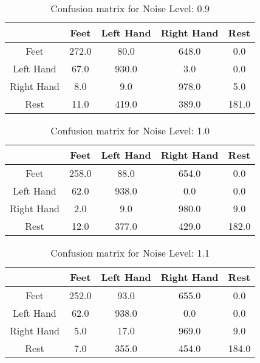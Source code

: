 \begin{table}[!htbp]
    \centering
    \begin{tabular}{|c||c|c|c|c|}
        \hline
		 & Feet & Left Hand & Right Hand & Rest \\
        \hline
        \hline
        Feet & 272.0 & 80.0 & 648.0 & 0.0 \\
        \hline
        Left Hand & 67.0 & 930.0 & 3.0 & 0.0 \\
        \hline
        Right Hand & 8.0 & 9.0 & 978.0 & 5.0 \\
        \hline
        Rest & 11.0 & 419.0 & 389.0 & 181.0 \\
        \hline
    \end{tabular}
    \caption{Confusion matrix for Noise Level: 0.9}
\end{table}

\begin{table}[!htbp]
    \centering
    \begin{tabular}{|c||c|c|c|c|}
        \hline
		 & Feet & Left Hand & Right Hand & Rest \\
        \hline
        \hline
        Feet & 258.0 & 88.0 & 654.0 & 0.0 \\
        \hline
        Left Hand & 62.0 & 938.0 & 0.0 & 0.0 \\
        \hline
        Right Hand & 2.0 & 9.0 & 980.0 & 9.0 \\
        \hline
        Rest & 12.0 & 377.0 & 429.0 & 182.0 \\
        \hline
    \end{tabular}
    \caption{Confusion matrix for Noise Level: 1.0}
\end{table}

\begin{table}[!htbp]
    \centering
    \begin{tabular}{|c||c|c|c|c|}
        \hline
		 & Feet & Left Hand & Right Hand & Rest \\
        \hline
        \hline
        Feet & 252.0 & 93.0 & 655.0 & 0.0 \\
        \hline
        Left Hand & 62.0 & 938.0 & 0.0 & 0.0 \\
        \hline
        Right Hand & 5.0 & 17.0 & 969.0 & 9.0 \\
        \hline
        Rest & 7.0 & 355.0 & 454.0 & 184.0 \\
        \hline
    \end{tabular}
    \caption{Confusion matrix for Noise Level: 1.1}
\end{table}

